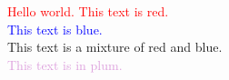 \documentclass{article}
\begin{document}
	\pagecolor{Goldenrod!50}
	\Large\textcolor{red}{Hello world. This text is red.}\\
	\Large\textcolor{blue}{This text is blue.}\\
	
	\textcolor{red!50!blue}{This text is a mixture of red and blue.}\\
	
	\textcolor{Plum}{This text is in plum.}
\end{document}
